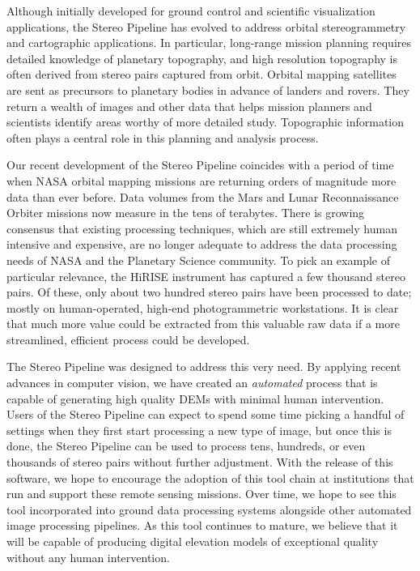 Although initially developed for ground control and scientific
visualization applications, the Stereo Pipeline has evolved
 to address orbital stereogrammetry and cartographic
applications.  In particular, long-range mission planning requires
detailed knowledge of planetary topography, and high resolution
topography is often derived from stereo pairs captured from orbit.
Orbital mapping satellites are sent as precursors to planetary bodies
in advance of landers and rovers.  They return a wealth of images and
other data that helps mission planners and scientists identify areas
worthy of more detailed study. Topographic information often plays a
central role in this planning and analysis process.

Our recent development of the Stereo Pipeline coincides with a
period of time when \ac{NASA} orbital mapping missions are returning
orders of magnitude more data than ever before.  Data volumes from
the Mars and Lunar Reconnaissance Orbiter missions now measure in
the tens of terabytes.  There is growing consensus that existing
processing techniques, which are still extremely human intensive
and expensive, are no longer adequate to address the data processing
needs of \ac{NASA} and the Planetary Science community.  To pick
an example of particular relevance, the \ac{HiRISE} instrument has
captured a few thousand stereo pairs.
Of these, only about two hundred stereo pairs have been processed to
date; mostly on human-operated, high-end photogrammetric workstations.
It is clear that much more value could be extracted from this
valuable raw data if a more streamlined, efficient process could be
developed.

The Stereo Pipeline was designed to address this very need.  By
applying recent advances in computer vision, we have
created an {\em automated} process that is capable of generating high
quality \acp{DEM} with minimal human intervention.  Users of the Stereo
Pipeline can expect to spend some time picking a handful of settings
when they first start processing a new type of image, but once this
is done, the Stereo Pipeline can be used to process tens, hundreds, or
even thousands of stereo pairs without further adjustment.  With the
release of this software, we hope to encourage the adoption of this
tool chain at institutions that run and support these remote sensing
missions.  Over time, we hope to see this tool incorporated into
ground data processing systems alongside other automated image
processing pipelines.  As this tool continues to mature, we believe
that it will be capable of producing digital elevation models of
exceptional quality without any human intervention.

